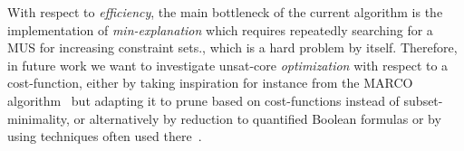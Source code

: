 With respect to \emph{efficiency}, the main bottleneck of the current algorithm is the implementation of \textit{min-explanation} which requires repeatedly searching for a MUS for increasing constraint sets., which is a hard problem by itself.
Therefore, in future work we want to investigate unsat-core \emph{optimization} with respect to a cost-function, either by taking inspiration for instance from the MARCO algorithm~\cite{liffiton2013enumerating} but adapting it to prune based on cost-functions instead of subset-minimality, or alternatively by reduction to quantified Boolean formulas or by using techniques often used there~\cite{QBF,DBLP:journals/constraints/IgnatievJM16}.